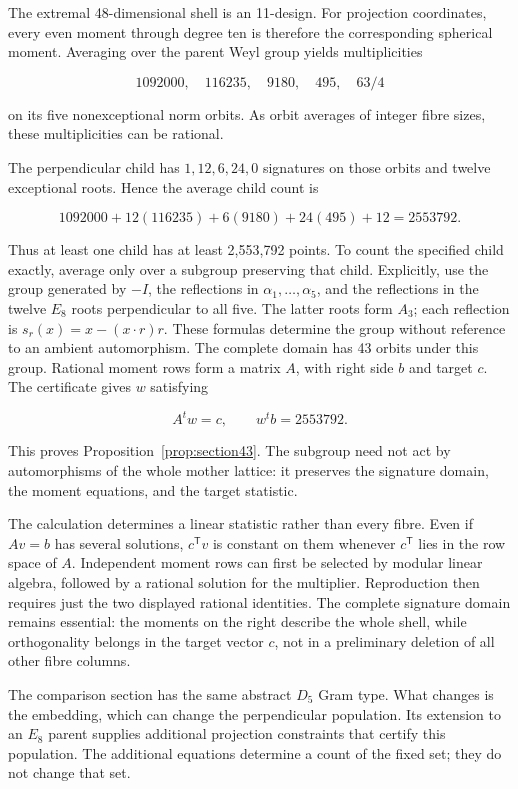 The extremal 48-dimensional shell is an 11-design. For projection
coordinates, every even moment through degree ten is therefore the
corresponding spherical moment. Averaging over the parent Weyl group
yields multiplicities

\[
1092000,\quad116235,\quad9180,\quad495,\quad63/4
\]

on its five nonexceptional norm orbits. As orbit averages of integer
fibre sizes, these multiplicities can be rational.

The perpendicular child has \(1,12,6,24,0\) signatures on those orbits
and twelve exceptional roots. Hence the average child count is

\[
1092000+12(116235)+6(9180)+24(495)+12=2553792.
\]

Thus at least one child has at least 2,553,792 points. To count the
specified child exactly, average only over a subgroup preserving that
child. Explicitly, use the group generated by $-I$, the reflections in
$\alpha_1,\ldots,\alpha_5$, and the reflections in the twelve $E_8$
roots perpendicular to all five. The latter roots form $A_3$; each
reflection is $s_r(x)=x-(x\cdot r)r$. These formulas determine the group
without reference to an ambient automorphism. The complete domain has
43 orbits under this group. Rational moment rows
form a matrix \(A\), with right side \(b\) and target \(c\). The
certificate gives \(w\) satisfying

\[
A^tw=c,\qquad w^tb=2553792.
\]

This proves Proposition~\ref{prop:section43}. The subgroup need not act by
automorphisms of the whole mother lattice: it preserves the signature
domain, the moment equations, and the target statistic.

The calculation determines a linear statistic rather than every fibre.
Even if $Av=b$ has several solutions, $c^{\mathsf T}v$ is constant on
them whenever $c^{\mathsf T}$ lies in the row space of $A$.
Independent moment rows can first be selected by modular linear algebra,
followed by a rational solution for the multiplier. Reproduction then
requires just the two displayed rational identities. The complete
signature domain remains essential: the moments on the right describe
the whole shell, while orthogonality belongs in the target vector $c$,
not in a preliminary deletion of all other fibre columns.

The comparison section has the same abstract \(D_5\) Gram type. What
changes is the embedding, which can change the perpendicular population.
Its extension to an \(E_8\) parent supplies additional projection
constraints that certify this population. The additional equations
determine a count of the fixed set; they do not change that set.

